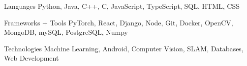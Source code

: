 \documentclass[12pt, letterpaper]{awesome-cv}
\begin{document}
\begin{cvskills}
  \cvskill
    {Languages} %
    {Python, Java, C++, C, JavaScript, TypeScript, SQL, HTML, CSS} %

  \cvskill
    {Frameworks + Tools} %
    {PyTorch, React, Django, Node, Git, Docker, OpenCV, MongoDB, mySQL, PostgreSQL, Numpy} %
  
  \cvskill
    {Technologies} %
    {Machine Learning, Android, Computer Vision, SLAM, Databases, Web Development} %
    
\end{cvskills}

\end{document}
